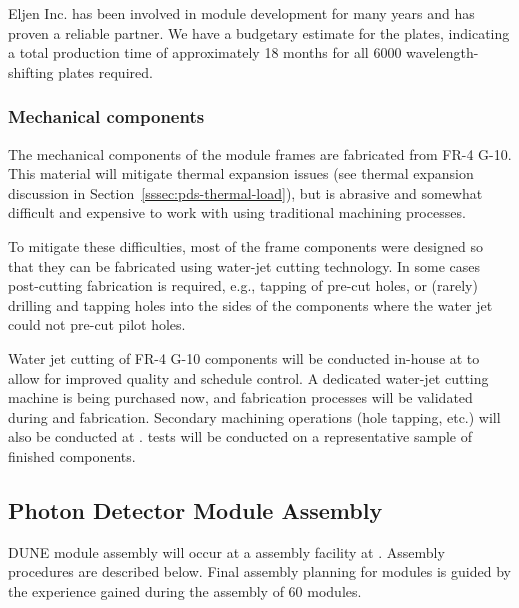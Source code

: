 Eljen Inc. has been involved in  module development for many years and has proven a reliable partner.  We have a budgetary estimate for the plates, indicating a total production time of approximately \num{18} months for all \num{6000} wavelength-shifting plates required.

\subsubsection{Mechanical components}

The mechanical components of the  module frames are fabricated from
FR-4 G-10. This material will mitigate thermal expansion issues (see thermal expansion discussion in Section~\ref{sssec:pds-thermal-load}),
but is abrasive and somewhat difficult and expensive to work with using traditional machining processes.

To mitigate these difficulties, most of the  frame components were designed so that they can be fabricated using water-jet cutting technology.  In some cases post-cutting fabrication is required, e.g., tapping of pre-cut holes, or (rarely) drilling and tapping holes into the sides of the components where the water jet could not pre-cut pilot holes.

Water jet cutting of FR-4 G-10 components will be conducted in-house at  to allow for improved quality and schedule control.  A dedicated water-jet cutting machine is being purchased now, and fabrication processes will be validated during  and  fabrication.  Secondary machining operations (hole tapping, etc.) will also be conducted at .   tests will be conducted on a representative sample of finished components.

\label{sec:fdsp-pd-prod-pc}

\subsection{Photon Detector Module Assembly}

DUNE   module assembly will occur at a  assembly facility at .  Assembly procedures are described below.  Final assembly planning for  modules is guided by the experience gained during the assembly of \num{60}   modules. 


